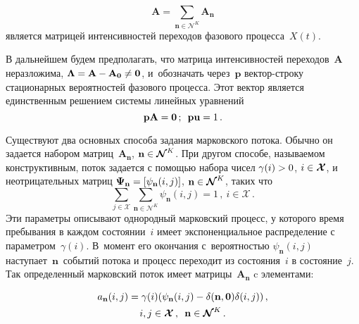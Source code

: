 {\begin{multicols}{2}
\begin{enumerate}[(1)]
\vspace*{-2pt}

\noindent
\begin{equation*}
\mathbf{A}=\sum\limits_{\mathbf{n}\in \boldsymbol{\mathcal{N}}^K} 
\mathbf{A}_{\mathbf{n}}
\end{equation*}
является матрицей интенсивностей переходов фазового процесса~$X(t)$.
  \end{enumerate}
  
  В дальнейшем будем предполагать, что  матрица интенсивностей 
переходов~$\mathbf{A}$ неразложима, $\boldsymbol{\Lambda}\hm= 
\mathbf{A}\hm- \mathbf{A}_{\mathbf{0}}\not= \mathbf{0}$, и~обозначать 
через~$\mathbf{p}$ век\-тор-стро\-ку стационарных вероятностей фазового 
процесса. Этот вектор является единственным решением сис\-те\-мы линейных 
уравнений
  \begin{equation*}
  \mathbf{p}\mathbf{A}=\mathbf{0}\,;\enskip \mathbf{p}\mathbf{u}=1\,.
  \end{equation*}
  
  Существуют два основных способа задания марковского потока. Обычно он 
задается набором матриц~$\mathbf{A}_{\mathbf{n}}$, $\mathbf{n}\hm\in 
\boldsymbol{\mathcal{N}}^K$. При другом способе, называемом 
конструктивным, поток задается с помощью  набора чисел $\gamma(i)\hm>0$, 
$i\hm\in \boldsymbol{\mathcal{X}}$, и неотрицательных матриц 
$\boldsymbol{\Psi}_{\mathbf{n}}\hm= 
[\psi_{\mathbf{n}}(i,j)]$, $\mathbf{n}\hm\in 
\boldsymbol{\mathcal{N}}^K$, таких что  
  $$
  \sum\limits_{j\in \boldsymbol{\mathcal{X}}} \sum\limits_{\mathbf{n}\in 
\boldsymbol{\mathcal{N}}^K} \psi_{\mathbf{n}}(i,j)=1\,,\ i\in 
\boldsymbol{\mathcal{X}}\,.
  $$
  Эти параметры описывают однородный марковский процесс, у которого 
время пребывания в каж\-дом состоянии~$i$ имеет экспоненциальное 
распределение с параметром~$\gamma(i)$. В~момент его окончания 
с~вероятностью $\psi_{\mathbf{n}}(i,j)$ наступает~$\mathbf{n}$~событий 
потока и процесс переходит из состояния~$i$ в состояние~$j$. Так 
определенный марковский поток имеет матрицы~$\mathbf{A}_{\mathbf{n}}$ c 
элементами:

\noindent
  \begin{multline*}
  a_{\mathbf{n}}(i,j)=\gamma(i)(\psi_{\mathbf{n}}(i,j)-\delta 
(\mathbf{n},\mathbf{0})\delta(i,j))\,,\\ 
  i,j\in \boldsymbol{\mathcal{X}}\,,\enskip
   \mathbf{n}\in 
\boldsymbol{\mathcal{N}}^K\,.
  \end{multline*}                         
  

\end{multicols}}
